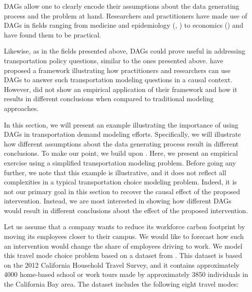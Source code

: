 DAGs allow one to clearly encode their assumptions about the data generating process and the problem at hand.
Researchers and practitioners have made use of DAGs in fields ranging from medicine and epidemiology (\citet{shrier_platt_2008}, \citet{sung_2011}) to economics (\citet{white2011causal}) and have found them to be practical.


Likewise, as in the fields presented above, DAGs could prove useful in addressing transportation policy questions, similar to the ones presented above.
\citet{brathwaite_2018_causal} have proposed a framework illustrating how practitioners and researchers can use DAGs
 to answer such transportation modeling questions in a causal context.
However, \citet{brathwaite_2018_causal} did not show an empirical application of their framework and how it results
 in different conclusions when compared to traditional modeling approaches.

In this section, we will present an example illustrating the importance of using DAGs in transportation demand modeling efforts.
Specifically, we will illustrate how different assumptions about the data generating process result in different conclusions.
To make our point, we build upon \citet{brathwaite_2018_causal}.
Here, we present an empirical exercise using a simplified transportation modeling problem.
Before going any further, we note that this example is illustrative, and it does not reflect all complexities in a typical transportation choice modeling problem.
Indeed, it is not our primary goal in this section to recover the causal effect of the proposed intervention.
Instead, we are most interested in showing how different DAGs would result in different conclusions about the effect of the proposed intervention.

Let us assume that a company wants to reduce its workforce carbon footprint by moving its employees closer to their campus.
We would like to forecast how such an intervention would change the share of employees driving to work.
We model this travel mode choice problem based on a dataset from \citet{brathwaite_asymmetric}.
This dataset is based on the 2012 California Household Travel Survey, and it
contains approximately 4000 home-based school or work tours made by approximately 3850 individuals in the California Bay area.
The dataset includes the following eight travel modes:

